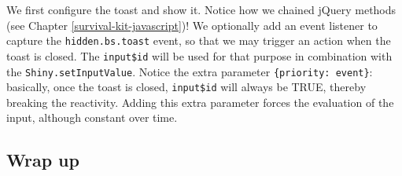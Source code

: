 \documentclass[
]{book}
\begin{document}
We first configure the toast and show it. Notice how we chained jQuery methods (see Chapter \ref{survival-kit-javascript})! We optionally add an event listener to capture the \texttt{hidden.bs.toast} event, so that we may trigger an action when the toast is closed. The \texttt{input\$id} will be used for that purpose in combination with the \texttt{Shiny.setInputValue}. Notice the extra parameter \texttt{\{priority:\ \textquotesingle{}event\textquotesingle{}\}}: basically, once the toast is closed, \texttt{input\$id} will always be TRUE, thereby breaking the reactivity. Adding this extra parameter forces the evaluation of the input, although constant over time.

\hypertarget{wrap-up}{%
\subsection{Wrap up}\label{wrap-up}}
\end{document}
